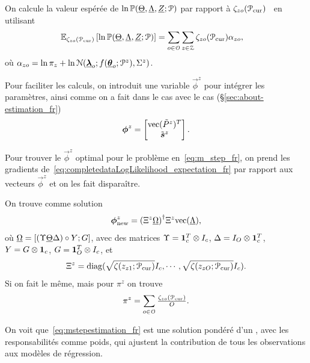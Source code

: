 \documentclass[../main.tex]{subfiles}
\begin{document}
On calcule la valeur espérée de ${\ln\mathbb{P}(\underline{\Theta},\underline{\Lambda},\underline{Z};\mathcal{P})}$ par rapport à ${\zeta_{zo}(\mathcal{P}_{\mathrm{cur}})}$~\cite[Chapitre 9]{Bishop2006} en utilisant
\begin{align}
  \label{eq:completedataLogLikelihood_expectation}
\expectation[{\zeta_{zo}(\set{P}_{\mathrm{cur}})}]{\ln\probability{\random{\Theta},\random{\Lambda},\random{Z};\set{P}}}&= \sum_{o\in\set{O}}\sum_{z\in\set{Z}}  \zeta_{zo}(\set{P}_{\mathrm{cur}})\alpha_{zo},
\end{align}
où ${\alpha_{zo}=\ln{\pi_{z}}+\ln{\mathcal{N}({\underline{\boldsymbol{\lambda}}}_{o};f({\underline{\boldsymbol{\theta}}}_{o};\mathcal{P}^{z}),{\Sigma^{z}})}}$.

Pour faciliter les calculs, on introduit une variable $\vec{\phi}^{z}$ pour intégrer les paramètres, ainsi comme on a fait dans le cas avec le cas \RLS{} (\S\ref{sec:about-estimation_fr})
\begin{equation}
  \boldsymbol{\phi}^{z}=\left[
      \begin{matrix}
      \mathrm{vec} (\tilde{P}^{z})^{T}\\\tilde{\boldsymbol{s}}^{z}
      \end{matrix}
    \right].
\end{equation}

Pour trouver le $\vec{\phi}^{z}$ optimal pour le problème en~\eqref{eq:m_step_fr}, on prend les gradients de~\eqref{eq:completedataLogLikelihood_expectation_fr} par rapport aux vecteurs $\vec{\phi}^{z}$ et on les fait disparaître.

On trouve comme solution
\begin{equation}
  \label{eq:mstepestimation_fr}
  \vec{\phi}^{z}_{\mathrm{new}}=\pseudoinv{(\Xi^{z}\random{\Omega})}\Xi^{z}\vectorize{\random{\Lambda}},
\end{equation}
où
${\underline{\Omega}=[(\Upsilon \underline{\Theta}\Delta)\circ Y;G]}$,
avec des matrices
${\Upsilon=\mathbf{1}_{c}^{T}\otimes I_{c}}$,
${\Delta=I_{O}\otimes\mathbf{1}_{c}^{T}}$,
${Y=G\otimes\mathbf{1}_{c}}$,
${G=\mathbf{1}_{O}^{T}\otimes I_{c}}$,
et
\[{\Xi^{z}={\operatorname{diag}(\sqrt{{\zeta(z_{z1};\mathcal{P}_{\mathrm{cur}})}}I_{c},\cdots,\sqrt{{\zeta(z_{zO};\mathcal{P}_{\mathrm{cur}})}}I_{c})}}.\]
Si on fait le même, mais pour $\pi^{z}$ on trouve
\begin{equation*}
  \label{eq:3_fr}
  \pi^{z}=\sum\limits_{o\in\set{O}}\tfrac{\zeta_{zo}(\set{P}_{\mathrm{cur}})}{O}.
\end{equation*}

On voit que~\eqref{eq:mstepestimation_fr} est une solution pondéré d'un \LS{}, avec les responsabilités comme poids,  qui ajustent la contribution de tous les observations aux modèles de régression.
\end{document}
